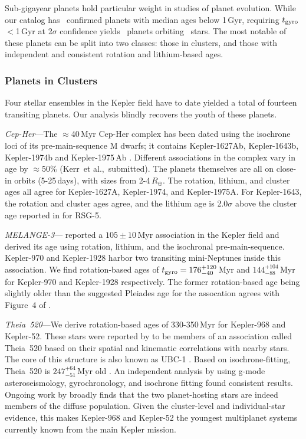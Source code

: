 \documentclass[11pt,twocolumn,tighten]{aastex63}
\begin{document}
Sub-gigayear planets hold particular weight in studies of planet
evolution.
While our catalog has \nplyounggyro\ confirmed planets
with median ages below 1\,Gyr, requiring $t_{\rm gyro}$$<$1\,Gyr at
2$\sigma$ confidence yields \nplyounggyrotwosigma\ planets orbiting
\nplhostsyounggyrotwosigma\ stars.  
The most notable of these planets can be split into two classes: those
in clusters, and those with independent and consistent rotation and
lithium-based ages.

\subsubsection{Planets in Clusters}
\label{subsec:clusterplanets}

Four stellar ensembles in the Kepler field have to date yielded a
total of fourteen transiting planets.  Our analysis blindly recovers
the youth of these planets.

{\it Cep-Her}---The $\approx$40\,Myr Cep-Her complex has been
dated using the isochrone loci of its
pre-main-sequence M dwarfs; it contains Kepler-1627Ab, Kepler-1643b,
Kepler-1974b and Kepler-1975\,Ab \citep{Bouma_2022b,Bouma_2022a}.
Different associations in the complex vary in age by $\approx$50\%
(Kerr~et al.,~submitted).  The planets
themselves are all on close-in orbits (5-25\,days), with sizes from
2-4\,$R_\oplus$.  The rotation, lithium, and cluster ages all agree
for Kepler-1627A, Kepler-1974, and Kepler-1975A.  For Kepler-1643, the
rotation and cluster ages agree, and the lithium age is 2.0$\sigma$
above the cluster age reported in \citet{Bouma_2022b} for RSG-5.

{\it MELANGE-3}---\citet{Barber_2022} reported a
$105\pm10$\,Myr association in the Kepler field and derived its age
using rotation, lithium, and the isochronal pre-main-sequence.
Kepler-970 and Kepler-1928 harbor two transiting mini-Neptunes inside
this association.  We find rotation-based ages
of $t_{\rm
gyro}=176_{-40}^{+120}$\,Myr and $144_{-88}^{+104}$\,Myr for
Kepler-970 and Kepler-1928 respectively.  The former rotation-based
age being slightly older than the suggested Pleiades age for the
assocation agrees with Figure~4 of \citet{Barber_2022}.

{\it Theia~520}---We derive rotation-based ages of 330-350\,Myr for
Kepler-968 and Kepler-52.  These stars were reported by
\citet{2019AJ....158..122K} to be members of an association called
Theia~520 based on their spatial and kinematic correlations with
nearby stars.  The core of this structure is also known as UBC-1
\citep{2018A&A...618A..59C}.  Based on isochrone-fitting,
Theia~520 is $247^{+64}_{-51}$\,Myr old \citep{2019AJ....158..122K}.
An independent analysis by \citet{2024A&A...681A..13F} using g-mode
asteroseismology, gyrochronology, and isochrone fitting found
consistent results.  Ongoing work by \citet{Curtis2024} broadly finds
that the two planet-hosting stars are indeed members of the diffuse
population.  Given the cluster-level and individual-star evidence,
this makes Kepler-968 and Kepler-52 the youngest multiplanet systems
currently known from the main Kepler mission.
\end{document}
